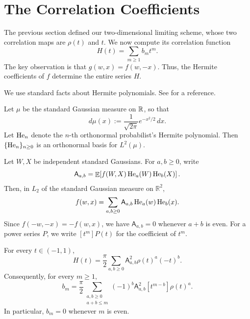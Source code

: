 
\section{The Correlation Coefficients}
\label{sec:coefficients}

The previous section defined our two-dimensional limiting scheme, whose two
correlation maps are \(\rho(t)\) and \(t\). We now compute its correlation
function
\[
  H(t)=\sum_{m\geq 1} b_m t^m.
\]
The key observation is that \(g(w,x)=f(w,-x)\). Thus, the Hermite
coefficients of \(f\) determine the entire series \(H\).

We use standard facts about Hermite polynomials. See  \cite{Andrews_Askey_Roy_1999} for a reference.  

Let $\mu$ be the standard Gaussian measure on $\mathbb{R}$, so that
\[
    d\mu(x):=\frac{1}{\sqrt{2\pi}}e^{-x^2/2}\,dx.
\]
Let \(\mathrm{He}_n\) denote the \(n\)-th orthonormal probabilist's Hermite polynomial. Then \(\{\mathrm{He}_n\}_{n\ge0}\) is an orthonormal basis for \(L^2(\mu)\).

Let \(W,X\) be independent standard Gaussians. For \(a,b\geq 0\), write
\begin{equation}
  \mathsf A_{a,b}
  =
  \mathop{\mathbb{E}}\!\left[
    f(W,X)\operatorname{He}_a(W)\operatorname{He}_b(X)
  \right].
  \label{eq:mathsfAab}
\end{equation}
Then, in \(L_2\) of the standard Gaussian measure on \(\mathbb{R}^2\),
\[
  f(w,x)
  =
  \sum_{a,b\geq 0}
  \mathsf A_{a,b}\operatorname{He}_a(w)\operatorname{He}_b(x).
\]
Since \(f(-w,-x)=-f(w,x)\), we have \(\mathsf A_{a,b}=0\) whenever
\(a+b\) is even. For a power series \(P\), we write \([t^m]P(t)\) for the
coefficient of \(t^m\).

\begin{theorem}
\label{thm:coefficient-formula}
For every \(t\in(-1,1)\),
\begin{equation}
  H(t)
  =
  \frac{\pi}{2}
  \sum_{a,b\geq 0}
  \mathsf A_{a,b}^2\rho(t)^a(-t)^b.
  \label{eq:H-coefficient-formula}
\end{equation}
Consequently, for every \(m\geq 1\),
\begin{equation}
  b_m
  =
  \frac{\pi}{2}
  \sum_{\substack{a,b\geq 0\\a+b\leq m}}
  (-1)^b\mathsf A_{a,b}^2
  [t^{m-b}]\rho(t)^a.
  \label{eq:bm-coefficient-formula}
\end{equation}
In particular, \(b_m=0\) whenever \(m\) is even.
\end{theorem}

